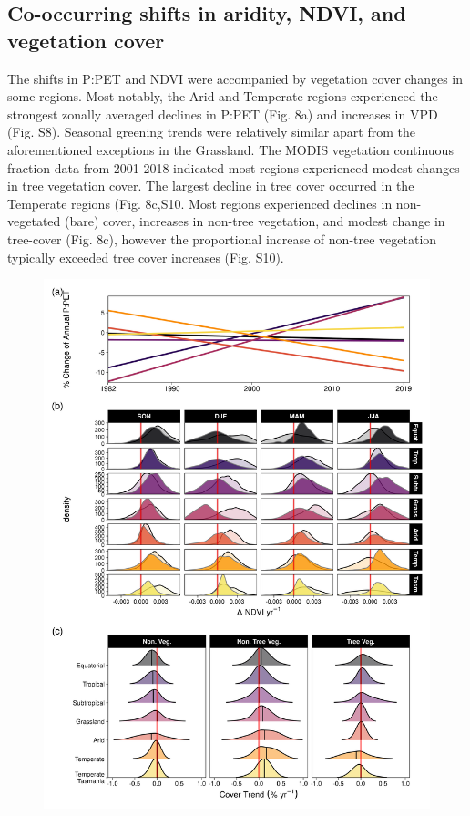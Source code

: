 \documentclass[gc, manuscript]{copernicus}
\begin{document}
\subsection{Co-occurring shifts in aridity, NDVI, and vegetation cover}

The shifts in P:PET and NDVI were accompanied by vegetation cover
changes in some regions. Most notably, the Arid and Temperate regions
experienced the strongest zonally averaged declines in P:PET (Fig. 8a)
and increases in VPD (Fig. S8). Seasonal greening trends were relatively
similar apart from the aforementioned exceptions in the Grassland. The
MODIS vegetation continuous fraction data from 2001-2018 indicated most
regions experienced modest changes in tree vegetation cover. The largest
decline in tree cover occurred in the Temperate regions (Fig. 8c,S10.
Most regions experienced declines in non-vegetated (bare) cover,
increases in non-tree vegetation, and modest change in tree-cover (Fig.
8c), however the proportional increase of non-tree vegetation typically
exceeded tree cover increases (Fig. S10). \clearpage 

\begin{figure}
\includegraphics[width=12cm]{../../figures/Fig8_PPET_change_ThielSen_VCF} \end{figure}
\clearpage
\end{document}
